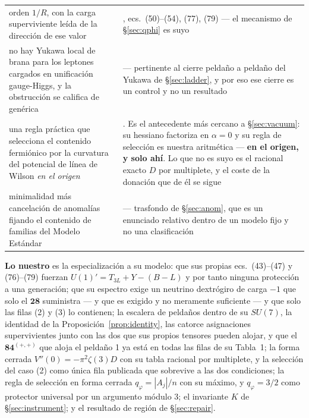 \documentclass[11pt,a4paper]{article}
\newcommand{\su}[1]{SU(#1)}
\newcommand{\rep}[1]{\mathbf{#1}}
\begin{document}
\begin{longtable}{p{}p{}}
orden $1/R$, con la carga superviviente leída de la dirección de ese valor & \cite{GHK},
ecs.~(50)--(54), (77), (79) --- el mecanismo de \S\ref{sec:qphi} es suyo\\
no hay Yukawa local de brana para los leptones cargados en unificación gauge-Higgs, y la obstrucción
se califica de genérica & \cite{SSS,Maru19} --- pertinente al cierre peldaño a peldaño del Yukawa de
\S\ref{sec:ladder}, y por eso ese cierre es un control y no un resultado\\
\rowcolor{amber!13}
una regla práctica que selecciona el contenido fermiónico por la curvatura del potencial de línea de
Wilson \emph{en el origen} & \cite{AdachiMaru}. Es el antecedente más cercano a \S\ref{sec:vacuum}:
su hessiano factoriza en $\alpha=0$ y su regla de selección es nuestra aritmética --- \textbf{en el
origen, y solo ahí}. Lo que no es suyo es el racional exacto $D$ por multiplete, y el coste de la
donación que de él se sigue\\
minimalidad más cancelación de anomalías fijando el contenido de familias del Modelo Estándar &
\cite{GengMarshak} --- trasfondo de \S\ref{sec:anom}, que es un enunciado relativo dentro de un
modelo fijo y no una clasificación\\
\bottomrule
\end{longtable}
\endgroup

\textbf{Lo nuestro} es la especialización a su modelo: que sus propias ecs.~(43)--(47) y (76)--(79)
fuerzan $U(1)'=T_{3L}+Y-(B-L)$ y por tanto ninguna protección a una generación; que su espectro exige
un neutrino dextrógiro de carga $-1$ que solo el $\rep{28}$ suministra --- y que es exigido y no
meramente suficiente --- y que solo las filas (2) y (3) lo contienen; la escalera de peldaños dentro
de su $\su7$, la identidad de la Proposición~\ref{prop:identity}, las catorce asignaciones
supervivientes junto con las dos que sus propios tensores pueden alojar, y que el $\rep{84}^{(+,+)}$
que aloja el peldaño 1 ya está en todas las filas de su Tabla~1; la forma cerrada
$V''(0)=-\pi^2\zeta(3)D$ con su tabla racional por multiplete, y la selección del caso (2) como única
fila publicada que sobrevive a las dos condiciones; la regla de selección en forma cerrada
$q_\varphi=|A_j|/n$ con su máximo, y
$q_\varphi=3/2$ como protector universal por un argumento módulo 3; el invariante $K$ de
\S\ref{sec:instrument}; y el resultado de región de \S\ref{sec:repair}.
\end{document}
